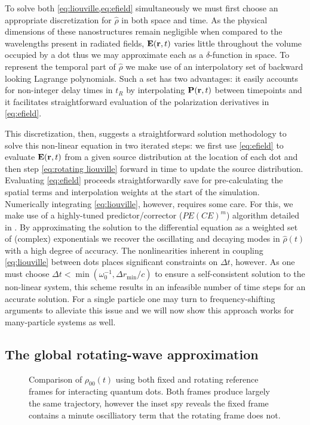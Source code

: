 \documentclass[conference]{IEEEtran}
\begin{document}
To solve both \cref{eq:liouville,eq:efield} simultaneously we must first choose an appropriate discretization for $\hat{\rho}$ in both space and time.
As the physical dimensions of these nanostructures remain negligible when compared to the wavelengths present in radiated fields, $\vb{E}(\vb{r}, t)$ varies little throughout the volume occupied by a dot thus we may approximate each as a $\delta$-function in space.
To represent the temporal part of $\hat{\rho}$ we make use of an interpolatory set of backward looking Lagrange polynomials.
Such a set has two advantages: it easily accounts for non-integer delay times in $t_R$ by interpolating $\vb{P}(\vb{r}, t)$ between timepoints and it facilitates straightforward evaluation of the polarization derivatives in \cref{eq:efield}.

This discretization, then, suggests a straightforward solution methodology to solve this non-linear equation in two iterated steps: we first use \cref{eq:efield} to evaluate $\vb{E}(\vb{r}, t)$ from a given source distribution at the location of each dot and then step \cref{eq:rotating liouville} forward in time to update the source distribution.
Evaluating \cref{eq:efield} proceeds straightforwardly save for pre-calculating the spatial terms and interpolation weights at the start of the simulation.
Numerically integrating \cref{eq:liouville}, however, requires some care.
For this, we make use of a highly-tuned predictor/corrector ($PE(CE)^m$) algorithm detailed in \cite{Glaser2009}.
By approximating the solution to the differential equation as a weighted set of (complex) exponentials we recover the oscillating and decaying modes in $\hat{\rho}(t)$ with a high degree of accuracy.
The nonlinearities inherent in coupling \cref{eq:liouville} between dots places significant constraints on $\Delta t$, however.
As one must choose $\Delta t < \min(\omega_0^{-1}, \Delta r_\text{min}/c)$ to ensure a self-consistent solution to the non-linear system, this scheme results in an infeasible number of time steps for an accurate solution.
For a single particle one may turn to frequency-shifting arguments to alleviate this issue and we will now show this approach works for many-particle systems as well.

\subsection{The global rotating-wave approximation}
\begin{figure}
  \centering
  
  \caption{\label{fig:frame comparison}
    Comparison of $\rho_{00}(t)$ using both fixed and rotating reference frames for interacting quantum dots.
    Both frames produce largely the same trajectory, however the inset spy reveals the fixed frame contains a minute oscilliatory term that the rotating frame does not.
  }
\end{figure}
\end{document}
